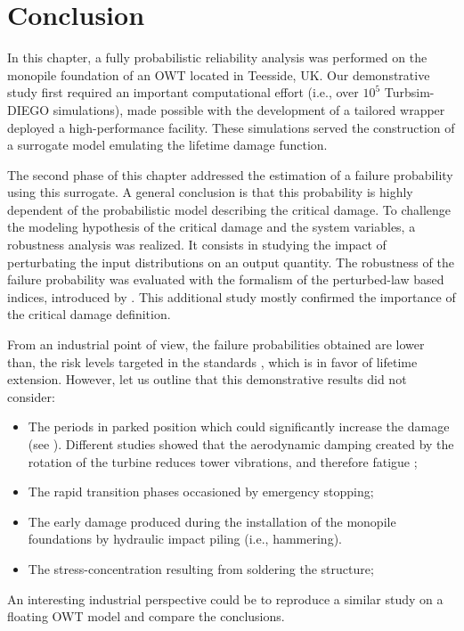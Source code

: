 \newpage
\section{Conclusion}

In this chapter, a fully probabilistic reliability analysis was performed on the monopile foundation of an OWT located in Teesside, UK. 
Our demonstrative study first required an important computational effort (i.e., over $10^5$ Turbsim-DIEGO simulations), made possible with the development of a tailored wrapper deployed a high-performance facility. 
These simulations served the construction of a surrogate model emulating the lifetime damage function. 

The second phase of this chapter addressed the estimation of a failure probability using this surrogate. 
A general conclusion is that this probability is highly dependent of the probabilistic model describing the critical damage. 
To challenge the modeling hypothesis of the critical damage and the system variables, a robustness analysis was realized. 
It consists in studying the impact of perturbating the input distributions on an output quantity.   
The robustness of the failure probability was evaluated with the formalism of the perturbed-law based indices, introduced by \citet{lemaitre_2015_PLI}.
This additional study mostly confirmed the importance of the critical damage definition. 

From an industrial point of view, the failure probabilities obtained are lower than, the risk levels targeted in the standards \citep{wang_2022_owt_reliability_review}, which is in favor of lifetime extension. 
However, let us outline that this demonstrative results did not consider: 
\begin{itemize}
    \item The periods in parked position which could significantly increase the damage (see \citealp{velarde_2020_fatigue_reliability}). 
    Different studies showed that the aerodynamic damping created by the rotation of the turbine reduces tower vibrations, and therefore fatigue \citep{liu_2017_damping};
    \item The rapid transition phases occasioned by emergency stopping;
    \item The early damage produced during the installation of the monopile foundations by hydraulic impact piling (i.e., hammering).  
    \item The stress-concentration resulting from soldering the structure;
\end{itemize} 
An interesting industrial perspective could be to reproduce a similar study on a floating OWT model and compare the conclusions.  

